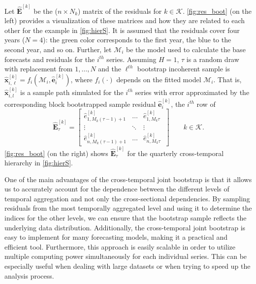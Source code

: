 \documentclass[12pt]{article}
\newcommand{\evet}{\bm{e}}
\newcommand{\xvet}{\bm{x}}
\newcommand{\Evet}{\bm{E}}
\theoremstyle{definition}
\begin{document}
Let $\widehat{\Evet}^{[k]}$ be the ($n \times N_k$) matrix of the residuals for $k \in \mathcal{K}$. \autoref{fig:res_boot} (on the left) provides a visualization of these matrices and how they are related to each other for the example in \autoref{fig:hierS}. It is assumed that the residuals cover four years ($N=4$): the green color corresponds to the first year, the blue to the second year, and so on. Further, let $\mathcal{M}_i$ be the model used to calculate the base forecasts and residuals for the $i^{th}$ series. %
Assuming $H = 1$, $\tau$ is a random draw with replacement from $1,\dots, N$ and the $\ell^{th}$ bootstrap incoherent sample is
$\widehat{\xvet}_{i,\ell}^{[k]} = f_i(\mathcal{M}_i, \widehat{\evet}_{i}^{[k]})$,
where $f_i(\cdot)$ depends on the fitted %
model $\mathcal{M}_i$. That is, $\widehat{\xvet}_{i,l}^{[k]}$ is a sample path simulated for the $i^{th}$ series with error approximated by the corresponding block bootstrapped sample residual $\widehat{\evet}_{i}^{[k]}$, the $i^{th}$ row of
$$
	\widehat{\Evet}^{[k]}_{\tau} = \begin{bmatrix}
		\widehat{e}^{[k]}_{1,M_k(\tau-1)+1} & \dots  & \widehat{e}^{[k]}_{1,M_k\tau}   \\[-0.25cm]
		\vdots                              & \ddots & \vdots                          \\[-0.25cm]
		\widehat{e}^{[k]}_{n,M_k(\tau-1)+1} & \dots  & \widehat{e}^{[k]}_{n,M_k\tau} \
	\end{bmatrix}\qquad k \in \mathcal{K}.
$$
\autoref{fig:res_boot} (on the right) shows $\widehat{\Evet}^{[k]}_{\tau}$ for the quarterly cross-temporal hierarchy in \autoref{fig:hierS}.



One of the main advantages of the cross-temporal joint bootstrap is that it allows us to accurately account for the dependence between the different levels of temporal aggregation and not only the cross-sectional dependencies. By sampling residuals from the most temporally aggregated level and using it to determine the indices for the other levels, we can ensure that the bootstrap sample reflects the underlying data distribution. Additionally, the cross-temporal joint bootstrap is easy to implement %
for many forecasting models, making it a practical and efficient tool. Furthermore, this approach is easily scalable in order to utilize multiple computing power simultaneously for each individual series. This can be especially useful when dealing with large datasets or when trying to speed up the analysis process.
\end{document}

